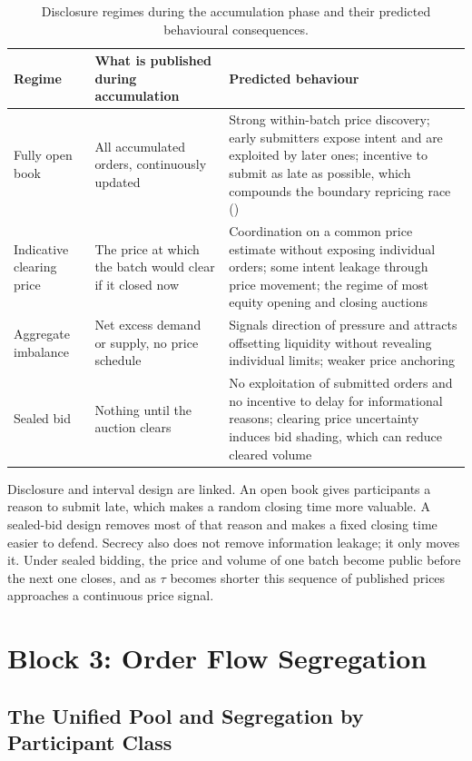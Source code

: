 \begin{table}[htbp]
\centering
\caption[Disclosure regimes and induced behaviour]{Disclosure regimes
during the accumulation phase and their predicted behavioural
consequences.}
\label{tab:disclosure}
\small
\begin{tabularx}{\textwidth}{@{}p{2.9cm} L L@{}}
\toprule
\textbf{Regime} & \textbf{What is published during accumulation} &
\textbf{Predicted behaviour}\\
\midrule
Fully open book & All accumulated orders, continuously updated &
Strong within-batch price discovery; early submitters expose intent and
are exploited by later ones; incentive to submit as late as possible,
which compounds the boundary repricing race ()\\
Indicative clearing price & The price at which the batch would clear if
it closed now & Coordination on a common price estimate without exposing
individual orders; some intent leakage through price movement; the
regime of most equity opening and closing auctions\\
Aggregate imbalance & Net excess demand or supply, no price schedule &
Signals direction of pressure and attracts offsetting liquidity without
revealing individual limits; weaker price anchoring\\
Sealed bid & Nothing until the auction clears & No exploitation of
submitted orders and no incentive to delay for informational reasons;
clearing price uncertainty induces bid shading, which can reduce cleared
volume\\
\bottomrule
\end{tabularx}
\end{table}

Disclosure and interval design are linked. An open book gives participants a
reason to submit late, which makes a random closing time more valuable. A
sealed-bid design removes most of that reason and makes a fixed closing time
easier to defend. Secrecy also does not remove information leakage; it only
moves it. Under sealed bidding, the price and volume of one batch become
public before the next one closes, and as $\tau$ becomes shorter this sequence of
published prices approaches a continuous price signal.

\section{Block 3: Order Flow Segregation}
\label{sec:segregation}

\subsection{The Unified Pool and Segregation by Participant Class}

